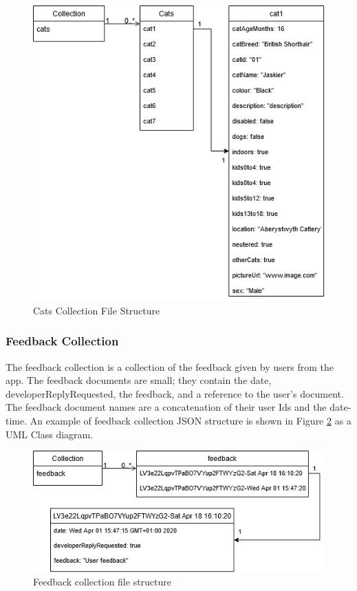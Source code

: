 \begin{figure} [htbp!]
    \centering
    \includegraphics[width=\textwidth]{Images/CatsCollectionFileStructure.png}
    \caption{Cats Collection File Structure}
    \label{fig:catsCollectionFileStructure}
\end{figure}
    
    \subsubsection{Feedback Collection}
    The feedback collection is a collection of the feedback given by users from the app. The feedback documents are small; they contain the date, developerReplyRequested, the feedback, and a reference to the user's document. The feedback document names are a concatenation of their user Ids and the date-time. An example of feedback collection JSON structure is shown in Figure \ref{fig:feedbackCollectionFileStructure} as a UML Class diagram.
    
 \begin{figure} [htbp!]
    \centering
    \includegraphics[width=\textwidth]{Images/FeedbackCollectionFileStructure.png}
    \caption{Feedback collection file structure}
    \label{fig:feedbackCollectionFileStructure}
\end{figure}  
    
